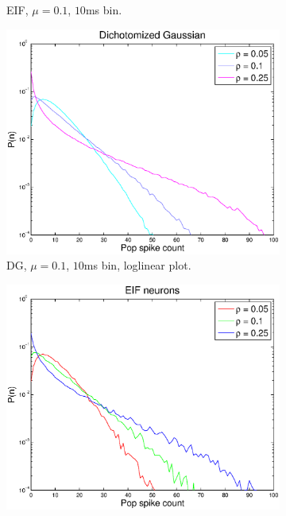 \documentclass[11pt]{article}
\begin{document}
\begin{figure}[H]
\begin{subfigure}[h]{0.5\textwidth}
	\caption{\footnotesize EIF, $\mu = 0.1$, $10$ms bin.}
	\label{fig2}
	\end{subfigure}
	\begin{subfigure}[h]{0.5\textwidth}
	\centering
	\includegraphics[width=\textwidth]{../Figures/DG/DG_Macke_2a_semilog}
	\caption{\footnotesize DG, $\mu = 0.1$, $10$ms bin, loglinear plot.}
	\label{fig3}
	\end{subfigure}
	\begin{subfigure}[h]{0.5\textwidth}
	\centering
	\includegraphics[width=\textwidth]{../Figures/EIF/EIF_Macke_2a_semilog}

\end{subfigure}
\end{figure}
\end{document}
